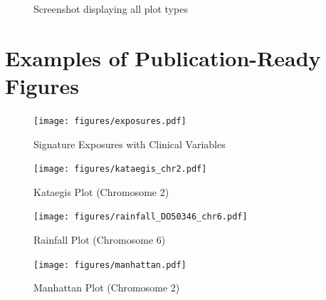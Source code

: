 \documentclass[12pt, letterpaper]{article}
\begin{document}
{}


\begin{figure}
    \centering
    \caption{Screenshot displaying all plot types}
\end{figure}

\pagebreak

\appendix                                     
\section{Examples of Publication-Ready Figures}
\renewcommand{\figurename}{Example Figure}
\setcounter{figure}{0}

\begin{figure}[h!]
    \centering
    \texttt{[image: figures/exposures.pdf]}
    \caption{Signature Exposures with Clinical Variables}
\end{figure}
\begin{figure}[h!]
    \centering
    \texttt{[image: figures/kataegis\_chr2.pdf]}
    \caption{Kataegis Plot (Chromosome 2)}
\end{figure}
\begin{figure}[h!]
    \centering
    \texttt{[image: figures/rainfall\_DO50346\_chr6.pdf]}
    \caption{Rainfall Plot (Chromosome 6)}
\end{figure}
\begin{figure}[h!]
    \centering
    \texttt{[image: figures/manhattan.pdf]}
    \caption{Manhattan Plot (Chromosome 2)}
\end{figure}
\end{document}

